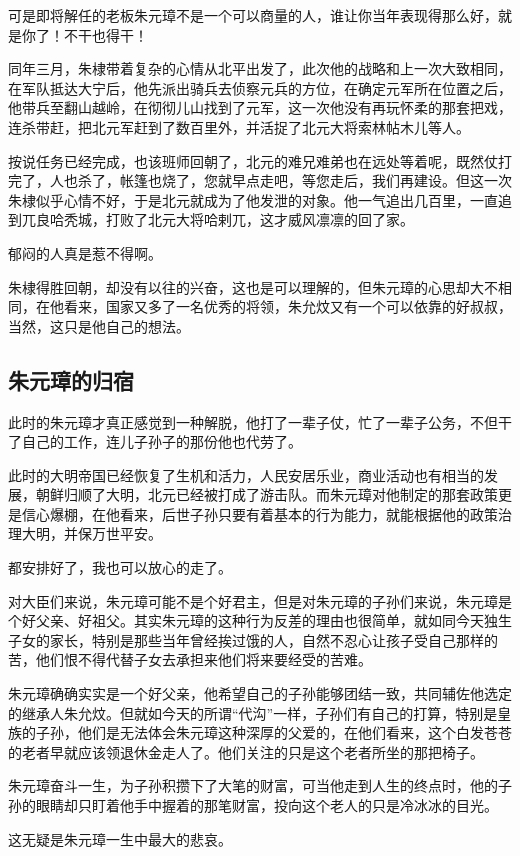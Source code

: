 \begin{multicols}{\theparacolNo}
		可是即将解任的老板朱元璋不是一个可以商量的人，谁让你当年表现得那么好，就是你了！不干也得干！

		同年三月，朱棣带着复杂的心情从北平出发了，此次他的战略和上一次大致相同，在军队抵达大宁后，他先派出骑兵去侦察元兵的方位，在确定元军所在位置之后，他带兵至翻山越岭，在彻彻儿山找到了元军，这一次他没有再玩怀柔的那套把戏，连杀带赶，把北元军赶到了数百里外，并活捉了北元大将索林帖木儿等人。

		按说任务已经完成，也该班师回朝了，北元的难兄难弟也在远处等着呢，既然仗打完了，人也杀了，帐篷也烧了，您就早点走吧，等您走后，我们再建设。但这一次朱棣似乎心情不好，于是北元就成为了他发泄的对象。他一气追出几百里，一直追到兀良哈秃城，打败了北元大将哈剌兀，这才威风凛凛的回了家。

		郁闷的人真是惹不得啊。

		朱棣得胜回朝，却没有以往的兴奋，这也是可以理解的，但朱元璋的心思却大不相同，在他看来，国家又多了一名优秀的将领，朱允炆又有一个可以依靠的好叔叔，当然，这只是他自己的想法。

		\subsection{朱元璋的归宿}
		此时的朱元璋才真正感觉到一种解脱，他打了一辈子仗，忙了一辈子公务，不但干了自己的工作，连儿子孙子的那份他也代劳了。

		此时的大明帝国已经恢复了生机和活力，人民安居乐业，商业活动也有相当的发展，朝鲜归顺了大明，北元已经被打成了游击队。而朱元璋对他制定的那套政策更是信心爆棚，在他看来，后世子孙只要有着基本的行为能力，就能根据他的政策治理大明，并保万世平安。

		都安排好了，我也可以放心的走了。

		对大臣们来说，朱元璋可能不是个好君主，但是对朱元璋的子孙们来说，朱元璋是个好父亲、好祖父。其实朱元璋的这种行为反差的理由也很简单，就如同今天独生子女的家长，特别是那些当年曾经挨过饿的人，自然不忍心让孩子受自己那样的苦，他们恨不得代替子女去承担来他们将来要经受的苦难。

		朱元璋确确实实是一个好父亲，他希望自己的子孙能够团结一致，共同辅佐他选定的继承人朱允炆。但就如今天的所谓“代沟”一样，子孙们有自己的打算，特别是皇族的子孙，他们是无法体会朱元璋这种深厚的父爱的，在他们看来，这个白发苍苍的老者早就应该领退休金走人了。他们关注的只是这个老者所坐的那把椅子。

		朱元璋奋斗一生，为子孙积攒下了大笔的财富，可当他走到人生的终点时，他的子孙的眼睛却只盯着他手中握着的那笔财富，投向这个老人的只是冷冰冰的目光。

		这无疑是朱元璋一生中最大的悲哀。


\end{multicols}
